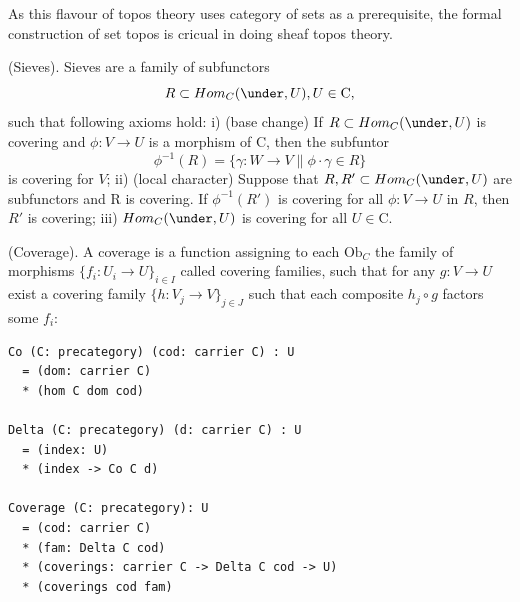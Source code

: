 As this flavour of topos theory uses category of sets as a prerequisite,
the formal construction of set topos is cricual in doing sheaf topos theory.

\begin{definition} (Sieves).
Sieves are a family of subfunctors
$$\def\mapright#1{\xrightarrow{{#1}}}
  \def\mapdown#1{\Big\downarrow\rlap{\raise2pt{\scriptstyle{#1}}}}
  \def\mapdiagl#1{\vcenter{\searrow}\rlap{\raise2pt{\scriptstyle{#1}}}}
  \def\mapdiagr#1{\vcenter{\swarrow}\rlap{\raise2pt{\scriptstyle{#1}}}}
  R \subset Hom_C(\under,U), U \in \mathrm{C},
$$
such that following axioms hold: i) (base change) If $R \subset Hom_C(\under,U)$ is covering
and $\phi : V \rightarrow U$ is a morphism of $\mathrm{C}$, then the subfuntor
$$
   \phi^{-1}(R) = \{ \gamma : W \rightarrow V \| \phi \cdot \gamma \in R \}
$$
is covering for $V$; ii) (local character) Suppose that $R,R' \subset Hom_C(\under,U)$ are
subfunctors and R is covering. If $\phi^{-1}(R')$ is covering for
all $\phi : V \rightarrow U$ in $R$, then $R'$ is covering; iii)
$Hom_C(\under,U)$ is covering for all $U \in \mathrm{C}$.
\end{definition}

\begin{definition} (Coverage).
A coverage is a function assigning
to each $\mathrm{Ob}_C$ the family of morphisms $\{f_i : U_i \rightarrow U \}_{i\in I}$ called
covering families, such that for any $g: V \rightarrow U$ exist
a covering family $\{h:V_j \rightarrow V\}_{j \in J}$ such that
each composite $h_j \circ g$ factors some $f_i$:
\begin{lstlisting}
Co (C: precategory) (cod: carrier C) : U
  = (dom: carrier C)
  * (hom C dom cod)

Delta (C: precategory) (d: carrier C) : U
  = (index: U)
  * (index -> Co C d)

Coverage (C: precategory): U
  = (cod: carrier C)
  * (fam: Delta C cod)
  * (coverings: carrier C -> Delta C cod -> U)
  * (coverings cod fam)
\end{lstlisting}
\end{definition}

